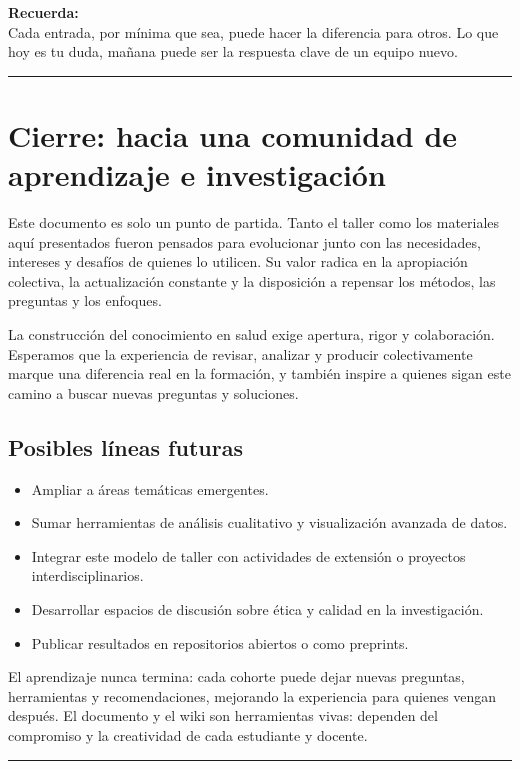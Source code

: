 \documentclass[
  letterpaper,
]{book}
\providecommand{\tightlist}{%
  \setlength{\itemsep}{0pt}\setlength{\parskip}{0pt}}\usepackage{longtable,booktabs,array}
\begin{document}
\textbf{Recuerda:}\\
Cada entrada, por mínima que sea, puede hacer la diferencia para otros.
Lo que hoy es tu duda, mañana puede ser la respuesta clave de un equipo
nuevo.

\begin{center}\rule{0.5\linewidth}{0.5pt}\end{center}


\chapter{Cierre: hacia una comunidad de aprendizaje e
investigación}\label{cierre-hacia-una-comunidad-de-aprendizaje-e-investigaciuxf3n}

Este documento es solo un punto de partida. Tanto el taller como los
materiales aquí presentados fueron pensados para evolucionar junto con
las necesidades, intereses y desafíos de quienes lo utilicen. Su valor
radica en la apropiación colectiva, la actualización constante y la
disposición a repensar los métodos, las preguntas y los enfoques.

La construcción del conocimiento en salud exige apertura, rigor y
colaboración. Esperamos que la experiencia de revisar, analizar y
producir colectivamente marque una diferencia real en la formación, y
también inspire a quienes sigan este camino a buscar nuevas preguntas y
soluciones.

\section{Posibles líneas futuras}\label{posibles-luxedneas-futuras}

\begin{itemize}
\tightlist
\item
  Ampliar a áreas temáticas emergentes.
\item
  Sumar herramientas de análisis cualitativo y visualización avanzada de
  datos.
\item
  Integrar este modelo de taller con actividades de extensión o
  proyectos interdisciplinarios.
\item
  Desarrollar espacios de discusión sobre ética y calidad en la
  investigación.
\item
  Publicar resultados en repositorios abiertos o como preprints.
\end{itemize}

El aprendizaje nunca termina: cada cohorte puede dejar nuevas preguntas,
herramientas y recomendaciones, mejorando la experiencia para quienes
vengan después. El documento y el wiki son herramientas vivas: dependen
del compromiso y la creatividad de cada estudiante y docente.

\begin{center}\rule{0.5\linewidth}{0.5pt}\end{center}


\backmatter
\end{document}
